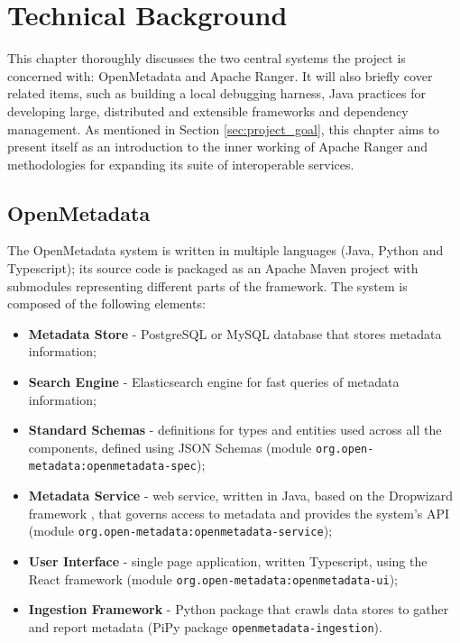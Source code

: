 \chapter{\label{cha:context} Technical Background}

This chapter thoroughly discusses the two central systems the project is concerned with: OpenMetadata and Apache Ranger. It will also briefly cover related items, such as building a local debugging harness, Java practices for developing large, distributed and extensible frameworks and dependency management. As mentioned in Section \ref{sec:project_goal}, this chapter aims to present itself as an introduction to the inner working of Apache Ranger and methodologies for expanding its suite of interoperable services.  

\section{OpenMetadata}

The OpenMetadata system is written in multiple languages (Java, Python and Typescript); its source code is packaged as an Apache Maven project with submodules representing different parts of the framework. The system is composed of the following elements:

\begin{itemize}
    \item \textbf{Metadata Store} - PostgreSQL or MySQL database that stores metadata information;
    \item \textbf{Search Engine} - Elasticsearch engine for fast queries of metadata information;
    \item \textbf{Standard Schemas} - definitions for types and entities used across all the components, defined using JSON Schemas \cite{foundationOfJsonSchemaPezoa2016} (module \texttt{org.open-metadata:openmetadata-spec});  
    \item \textbf{Metadata Service} - web service, written in Java, based on the Dropwizard framework \cite{dropwizardTech}, that governs access to metadata and provides the system's API (module \texttt{org.open-metadata:openmetadata-service});
    \item \textbf{User Interface} - single page application, written Typescript, using the React framework \cite{reactTech} (module \texttt{org.open-metadata:openmetadata-ui});
    \item \textbf{Ingestion Framework} - Python package that crawls data stores to gather and report metadata (PiPy package \texttt{openmetadata-ingestion}).
\end{itemize}

